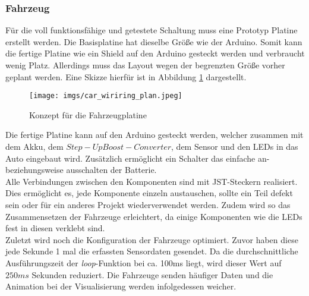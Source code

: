 \documentclass[.../Dokumentation.tex]{subfiles}
\begin{document}
    \subsubsection*{Fahrzeug}
    Für die voll funktionsfähige und getestete Schaltung muss eine Prototyp Platine erstellt werden. Die Basisplatine hat dieselbe Größe wie der Arduino. Somit kann die fertige Platine wie ein Shield auf den Arduino gesteckt werden und verbraucht wenig Platz. Allerdings muss das Layout wegen der begrenzten Größe vorher geplant werden. Eine Skizze hierfür ist in Abbildung \ref{fig-hardware-car-pcb-plan} dargestellt. 
    \begin{figure}[H]
    	\begin{center}
    		\texttt{[image: imgs/car\_wiriring\_plan.jpeg]}
    		\caption{Konzept für die Fahrzeugplatine}
    		\label{fig-hardware-car-pcb-plan}
    	\end{center}
    \end{figure} 
	\noindent
    Die fertige Platine kann auf den Arduino gesteckt werden, welcher zusammen mit dem Akku, dem $Step-Up Boost-Converter$, dem Sensor und den LEDs in das Auto eingebaut wird. Zusätzlich ermöglicht ein Schalter das einfache an- beziehungsweise ausschalten der Batterie.\\
    Alle Verbindungen zwischen den Komponenten sind mit JST-Steckern realisiert. Dies ermöglicht es, jede Komponente einzeln austauschen, sollte ein Teil defekt sein oder für ein anderes Projekt wiederverwendet werden. Zudem wird so das Zusammensetzen der Fahrzeuge erleichtert, da einige Komponenten wie die LEDs fest in diesen verklebt sind.\\
    Zuletzt wird noch die Konfiguration der Fahrzeuge optimiert. Zuvor haben diese jede Sekunde 1 mal die erfassten Sensordaten gesendet. Da die durchschnittliche Ausführungszeit der \emph{loop}-Funktion bei ca. 100ms liegt, wird dieser Wert auf $250ms$ Sekunden reduziert. Die Fahrzeuge senden häufiger Daten und die Animation bei der Visualisierung werden infolgedessen weicher.
    
\end{document}
